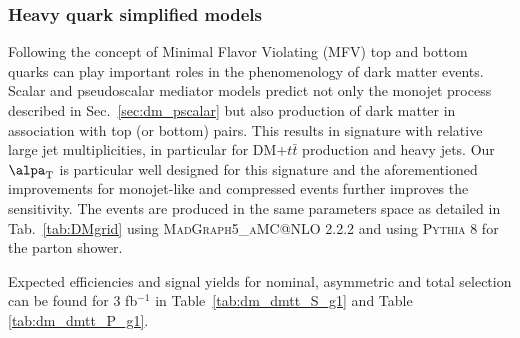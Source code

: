 \clearpage
\subsubsection{Heavy quark simplified models}

Following the concept of Minimal Flavor Violating (MFV) top and bottom quarks can play important roles in the phenomenology of dark matter events.
Scalar and pseudoscalar mediator models predict not only the monojet process described in Sec.~\ref{sec:dm_pscalar} but also production of dark matter in association
with top (or bottom) pairs. This results in signature with relative large jet multiplicities, in particular for DM$+t\bar{t}$ production and heavy jets. Our $\alpa_{\textrm{T}}$ is particular well designed for this signature and the aforementioned improvements for monojet-like and compressed events further improves the sensitivity. The events are produced in the same parameters space as detailed in Tab.~\ref{tab:DMgrid} using \textsc{MadGraph5\_aMC@NLO} 2.2.2 and using \textsc{Pythia 8} for the parton shower.

Expected efficiencies and signal yields for nominal, asymmetric and total selection can be found for 3 fb$^{-1}$ in Table~\ref{tab:dm_dmtt_S_g1} and Table \ref{tab:dm_dmtt_P_g1}.

